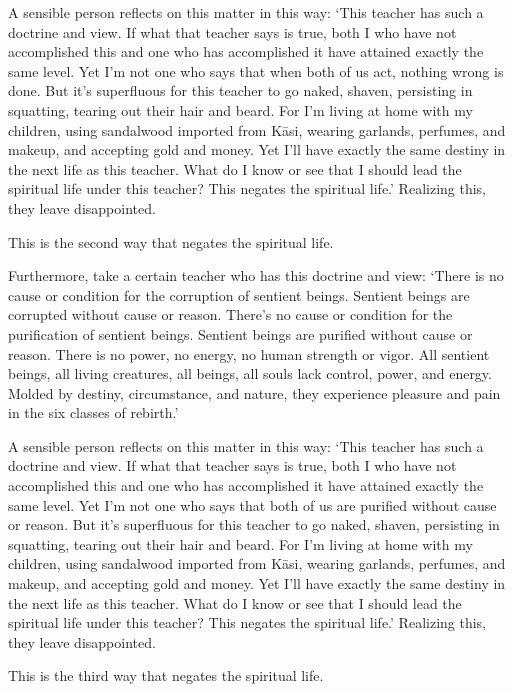 \documentclass[12pt,openany]{book}%
\begin{document}
A sensible person reflects on this matter in this way: ‘This teacher has such a doctrine and view. If what that teacher says is true, both I who have not accomplished this and one who has accomplished it have attained exactly the same level. Yet I’m not one who says that when both of us act, nothing wrong is done. But it’s superfluous for this teacher to go naked, shaven, persisting in squatting, tearing out their hair and beard. For I’m living at home with my children, using sandalwood imported from \textsanskrit{Kāsi}, wearing garlands, perfumes, and makeup, and accepting gold and money. Yet I’ll have exactly the same destiny in the next life as this teacher. What do I know or see that I should lead the spiritual life under this teacher? This negates the spiritual life.’ Realizing this, they leave disappointed. 

This is the second way that negates the spiritual life. 

Furthermore, take a certain teacher who has this doctrine and view: ‘There is no cause or condition for the corruption of sentient beings. Sentient beings are corrupted without cause or reason. There’s no cause or condition for the purification of sentient beings. Sentient beings are purified without cause or reason. There is no power, no energy, no human strength or vigor. All sentient beings, all living creatures, all beings, all souls lack control, power, and energy. Molded by destiny, circumstance, and nature, they experience pleasure and pain in the six classes of rebirth.’ 

A sensible person reflects on this matter in this way: ‘This teacher has such a doctrine and view. If what that teacher says is true, both I who have not accomplished this and one who has accomplished it have attained exactly the same level. Yet I’m not one who says that both of us are purified without cause or reason. But it’s superfluous for this teacher to go naked, shaven, persisting in squatting, tearing out their hair and beard. For I’m living at home with my children, using sandalwood imported from \textsanskrit{Kāsi}, wearing garlands, perfumes, and makeup, and accepting gold and money. Yet I’ll have exactly the same destiny in the next life as this teacher. What do I know or see that I should lead the spiritual life under this teacher? This negates the spiritual life.’ Realizing this, they leave disappointed. 

This is the third way that negates the spiritual life. 
\end{document}
